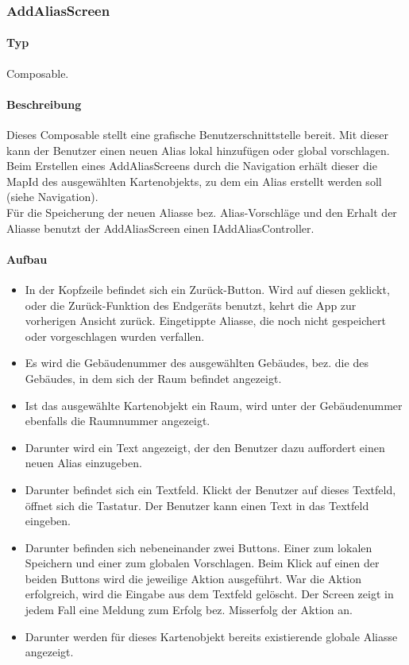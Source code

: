 \subsubsection{AddAliasScreen}
\paragraph*{Typ}
Composable.
\paragraph*{Beschreibung}
Dieses Composable stellt eine grafische Benutzerschnittstelle bereit.
Mit dieser kann der Benutzer einen neuen Alias lokal hinzufügen oder global vorschlagen.\\
Beim Erstellen eines AddAliasScreens durch die Navigation erhält dieser die MapId 
des ausgewählten Kartenobjekts, zu dem ein Alias erstellt werden soll (siehe Navigation).\\
Für die Speicherung der neuen Aliasse bez. Alias-Vorschläge und den Erhalt der Aliasse benutzt 
der AddAliasScreen einen IAddAliasController.

\paragraph*{Aufbau}
\begin{itemize}
    \item In der Kopfzeile befindet sich ein Zurück-Button. Wird auf diesen geklickt, oder die Zurück-Funktion des Endgeräts benutzt, 
    kehrt die App zur vorherigen Ansicht zurück. Eingetippte Aliasse, die noch nicht gespeichert oder vorgeschlagen wurden verfallen.
    \item Es wird die Gebäudenummer des ausgewählten Gebäudes, bez. die des Gebäudes, in dem sich der Raum befindet angezeigt.
    \item Ist das ausgewählte Kartenobjekt ein Raum, wird unter der Gebäudenummer ebenfalls die Raumnummer angezeigt.
    \item Darunter wird ein Text angezeigt, der den Benutzer dazu auffordert einen neuen Alias einzugeben.
    \item Darunter befindet sich ein Textfeld. Klickt der Benutzer auf dieses Textfeld, öffnet sich die Tastatur. 
    Der Benutzer kann einen Text in das Textfeld eingeben.
    \item Darunter befinden sich nebeneinander zwei Buttons. Einer zum lokalen Speichern und einer zum globalen Vorschlagen. 
    Beim Klick auf einen der beiden Buttons wird die jeweilige Aktion ausgeführt. War die Aktion erfolgreich, wird die Eingabe 
    aus dem Textfeld gelöscht. Der Screen zeigt in jedem Fall eine Meldung zum Erfolg bez. Misserfolg der Aktion an.
    \item Darunter werden für dieses Kartenobjekt bereits existierende globale Aliasse angezeigt.
\end{itemize}
